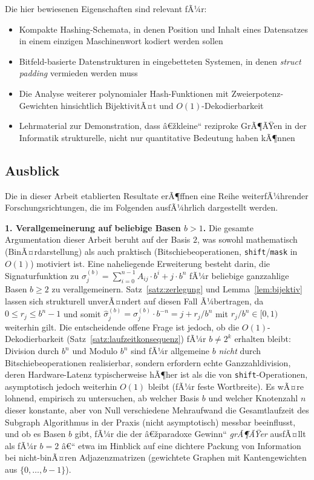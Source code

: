 ﻿\documentclass[a4paper,12pt]{article}
\theoremstyle{definition}
\begin{document}
Die hier bewiesenen Eigenschaften sind relevant fÃ¼r:
\begin{itemize}
	\item Kompakte Hashing-Schemata, in denen Position und Inhalt eines
	      Datensatzes in einem einzigen Maschinenwort kodiert werden sollen
	\item Bitfeld-basierte Datenstrukturen in eingebetteten Systemen, in
	      denen \emph{struct padding} vermieden werden muss
	\item Die Analyse weiterer polynomialer Hash-Funktionen mit
	      Zweierpotenz-Gewichten hinsichtlich BijektivitÃ¤t und
	      $O(1)$-Dekodierbarkeit
	\item Lehrmaterial zur Demonstration, dass â€žkleine`` reziproke GrÃ¶ÃŸen
	      in der Informatik strukturelle, nicht nur quantitative Bedeutung
	      haben kÃ¶nnen
\end{itemize}

\subsection{Ausblick}

Die in dieser Arbeit etablierten Resultate erÃ¶ffnen eine Reihe
weiterfÃ¼hrender Forschungsrichtungen, die im Folgenden ausfÃ¼hrlich
dargestellt werden.

\textbf{1. Verallgemeinerung auf beliebige Basen $b > 1$.}
Die gesamte Argumentation dieser Arbeit beruht auf der Basis $2$, was sowohl
mathematisch (BinÃ¤rdarstellung) als auch praktisch (Bitschiebeoperationen,
\texttt{shift}/\texttt{mask} in $O(1)$) motiviert ist. Eine naheliegende
Erweiterung besteht darin, die Signaturfunktion zu
$\sigma_j^{(b)} = \sum_{i=0}^{n-1}A_{ij}\cdot b^i + j\cdot b^n$ fÃ¼r beliebige
ganzzahlige Basen $b \geq 2$ zu verallgemeinern. Satz~\ref{satz:zerlegung}
und Lemma~\ref{lem:bijektiv} lassen sich strukturell unverÃ¤ndert auf diesen
Fall Ã¼bertragen, da $0 \leq r_j \leq b^n - 1$ und somit
$\hat\sigma_j^{(b)} = \sigma_j^{(b)}\cdot b^{-n} = j + r_j/b^n$ mit
$r_j/b^n\in[0,1)$ weiterhin gilt. Die entscheidende offene Frage ist jedoch,
ob die $O(1)$-Dekodierbarkeit (Satz~\ref{satz:laufzeitkonsequenz}) fÃ¼r $b\neq2^k$
erhalten bleibt: Division durch $b^n$ und Modulo $b^n$ sind fÃ¼r allgemeine
$b$ \emph{nicht} durch Bitschiebeoperationen realisierbar, sondern erfordern
echte Ganzzahldivision, deren Hardware-Latenz typischerweise hÃ¶her ist als
die von \texttt{shift}-Operationen, asymptotisch jedoch weiterhin $O(1)$
bleibt (fÃ¼r feste Wortbreite). Es wÃ¤re lohnend, empirisch zu untersuchen, ab
welcher Basis $b$ und welcher Knotenzahl $n$ dieser konstante, aber von Null
verschiedene Mehraufwand die Gesamtlaufzeit des Subgraph Algorithmus in der
Praxis (nicht asymptotisch) messbar beeinflusst, und ob es Basen $b$ gibt,
fÃ¼r die der â€žparadoxe Gewinn`` \emph{grÃ¶ÃŸer} ausfÃ¤llt als fÃ¼r $b=2$ â€“ etwa im
Hinblick auf eine dichtere Packung von Information bei nicht-binÃ¤ren
Adjazenzmatrizen (gewichtete Graphen mit Kantengewichten aus
$\{0,\ldots,b-1\}$).
\end{document}
